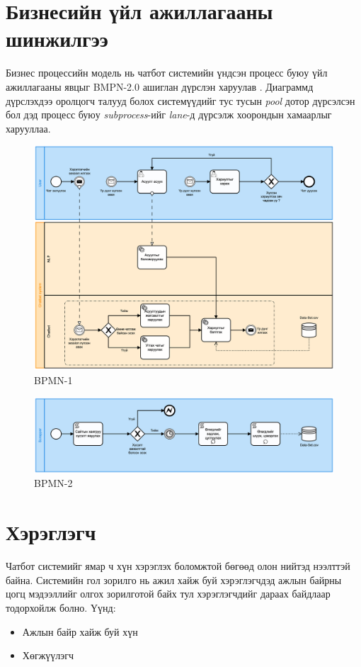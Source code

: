 \section{Бизнесийн үйл ажиллагааны шинжилгээ}
Бизнес процессийн модель нь чатбот системийн үндсэн процесс буюу үйл ажиллагааны явцыг BMPN-2.0 ашиглан дүрслэн харуулав \cite{BPMN}. Диаграммд дүрслэхдээ оролцогч талууд болох системүүдийг тус тусын \textit{pool} дотор дүрсэлсэн бол дэд процесс буюу \textit{subprocess}-ийг \textit{lane}-д дүрсэлж хоорондын хамаарлыг харууллаа. 
\begin{figure}[ht]
  \centering
  \includegraphics[width=\textwidth]{images/bpmn1.png}
  \caption{BPMN-1}\label{fig:bpmn1}
\end{figure}
\begin{figure}[ht]
\centering
\includegraphics[width=\textwidth]{images/bpmn2.png}
\caption{BPMN-2}\label{fig:bpmn2}
\end{figure}
\section{Хэрэглэгч}
Чатбот системийг ямар ч хүн хэрэглэх боломжтой бөгөөд олон нийтэд нээлттэй байна. Системийн гол зорилго нь ажил хайж буй хэрэглэгчдэд ажлын байрны цогц мэдээллийг олгох зорилготой байх тул хэрэглэгчдийг дараах байдлаар тодорхойлж болно. Үүнд:
\begin{itemize}
  \item Ажлын байр хайж буй хүн
  \item Хөгжүүлэгч
\end{itemize}
